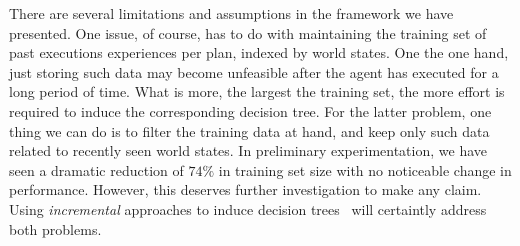 \bigskip
There are several limitations and assumptions in the framework we have presented.
One issue, of course, has to do with maintaining the training set of past executions experiences per plan, indexed by world states. One the one hand, just storing such data may become unfeasible after the agent has executed for a long period of time. What is more, the largest the training set, the more effort is required to induce the corresponding decision tree. For the latter problem, one thing we can do is to  filter the training data at hand, and keep only such data related to recently seen world states. In preliminary experimentation, we have seen a dramatic reduction of $74\%$ in training set size with no noticeable change in performance. However, this deserves further investigation to make any claim. Using \emph{incremental} approaches to induce decision trees~\cite{Utgoff:ML89} will certaintly address both problems.



